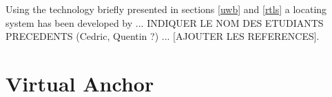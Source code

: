 Using the technology briefly presented in sections \ref{uwb} and \ref{rtls} a locating system has been developed by ... INDIQUER LE NOM DES ETUDIANTS PRECEDENTS (Cedric, Quentin ?) ... [AJOUTER LES REFERENCES].


\section{Virtual Anchor}

